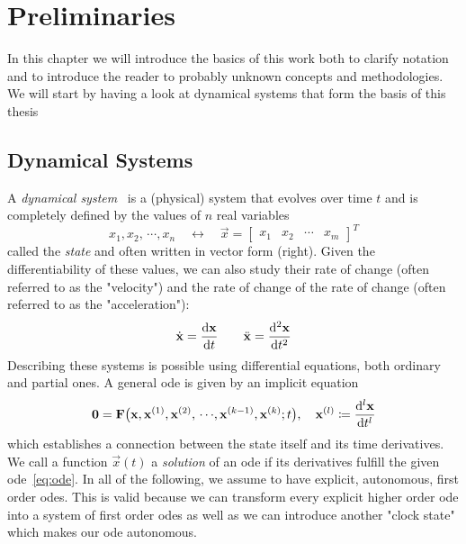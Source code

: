 \chapter{Preliminaries}
\label{c:preliminaries}



In this chapter we will introduce the basics of this work both to clarify notation and to introduce the reader to probably unknown concepts and methodologies. We will start by having a look at dynamical systems that form the basis of this thesis

\section{Dynamical Systems}
	A \emph{dynamical system}~\cite{birkhoffDynamicalSystems1927} is a (physical) system that evolves over time \(t\) and is completely defined by the values of \(n\) real variables
	\begin{equation*}
		x_1, x_2, \,\cdots\!, x_n \quad\longleftrightarrow\quad \vec{x} = \begin{bmatrix} x_1 & x_2 & \cdots & x_m \end{bmatrix}^T
	\end{equation*}
	called the \emph{state} and often written in vector form (right). Given the differentiability of these values, we can also study their rate of change (often referred to as the "velocity") and the rate of change of the rate of change (often referred to as the "acceleration"):
	\begin{equation*}
		\dot{\boldsymbol{\mathrm{x}}} = \dv{\boldsymbol{\mathrm{x}}}{t} \qquad \ddot{\boldsymbol{\mathrm{x}}} = \dv[2]{\boldsymbol{\mathrm{x}}}{t}
	\end{equation*}
	Describing these systems is possible using differential equations, both ordinary and partial ones. A general \ac{ode} is given by an implicit equation
	\begin{equation}
		\boldsymbol{\mathrm{0}} = \boldsymbol{\mathrm{F}}\big( \boldsymbol{\mathrm{x}}, \boldsymbol{\mathrm{x}}^{(1)}, \boldsymbol{\mathrm{x}}^{(2)}, \,\cdots\!, \boldsymbol{\mathrm{x}}^{(k - 1)}, \boldsymbol{\mathrm{x}}^{(k)}; t \big),\quad \boldsymbol{\mathrm{x}}^{(l)} \coloneqq \dv[l]{\boldsymbol{\mathrm{x}}}{t}  \label{eq:ode}
	\end{equation}
	which establishes a connection between the state itself and its time derivatives. We call a function \( \vec{x}(t) \) a \emph{solution} of an \ac{ode} if its derivatives fulfill the given \ac{ode}~\eqref{eq:ode}. In all of the following, we assume to have explicit, autonomous, first order \acp{ode}. This is valid because we can transform every explicit higher order \ac{ode} into a system of first order \acp{ode} as well as we can introduce another "clock state" which makes our \ac{ode} autonomous.

